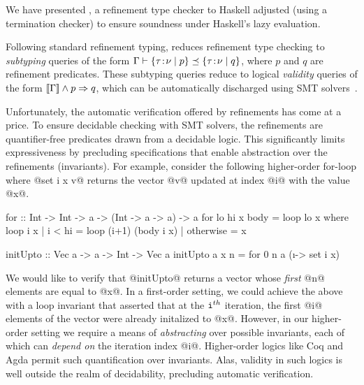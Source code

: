 
We have presented \toolname, 
a refinement type checker to Haskell 
adjusted (using a termination checker)
to ensure soundness under Haskell's lazy evaluation. 
%
\begin{comment}
Refinement types offer an automatic means 
of verifying semantic properties of programs, 
by decorating types with predicates from logics 
efficiently decidable by modern SMT solvers.
For example, the refinement type 
@{v: Int | v > 0}@
denotes the basic type \ttcode{Int} refined with a logical
predicate over the ``value variable" \ttcode{v}.
This type corresponds to the set of \ttcode{Int} values 
\ttcode{v} which additionally satisfy the logical predicate, 
\ie the set of positive integers.  
The (dependent) function type 
@x:{v:Int| v > 0} -> {v:Int| v < x}@
describes functions that take a positive argument 
\ttcode{x} and return an integer less than \ttcode{x}.
%
\end{comment}
Following standard refinement typing, \toolname reduces
refinement type checking to \emph{subtyping} queries 
of the form ${{{\Gamma} \vdash {\{ {{{\tau}}\!:\!{{\nu}}} \mid {p}\}} \preceq {\{ {{{\tau}}\!:\!{{\nu}}} \mid {q}\}}}}$,
where $p$ and $q$ are refinement predicates. 
These subtyping queries reduce to logical \emph{validity} 
queries of the form
${[\![\Gamma]\!] \wedge p \Rightarrow q}$, which can be 
automatically discharged using SMT solvers~\cite{z3}. 

Unfortunately, the automatic verification 
offered by refinements has come at a price. 
To ensure decidable checking with SMT solvers, the 
refinements are quantifier-free predicates drawn from a
decidable logic.  This significantly limits expressiveness by 
precluding specifications that enable abstraction over the 
refinements (\ie invariants). For example, consider the 
following higher-order for-loop where @set i x v@ returns 
the vector @v@ updated at index @i@ with the value @x@. 

\begin{code}
  for :: Int -> Int -> a -> (Int -> a -> a) -> a
  for lo hi x body      = loop lo x 
    where loop i x 
            | i < hi    = loop (i+1) (body i x)
            | otherwise = x
  
  initUpto :: Vec a -> a -> Int -> Vec a 
  initUpto a x n = for 0 n a (\i -> set i x) 
\end{code}

We would like to 
verify that @initUpto@ returns a vector whose \emph{first}
@n@ elements are equal to @x@. 
In a first-order setting, we could achieve the above with 
a loop invariant that asserted that at the $\texttt{i}^{th}$
iteration, the first @i@ elements of the vector were 
already initalized to @x@. 
%
However, in our higher-order setting we require a means 
of \emph{abstracting} over possible invariants, each of which can
\emph{depend on} the iteration index @i@. 
%
Higher-order logics like Coq and Agda permit such quantification 
over invariants. Alas, validity in such logics is well outside the 
realm of decidability, precluding automatic verification. 

